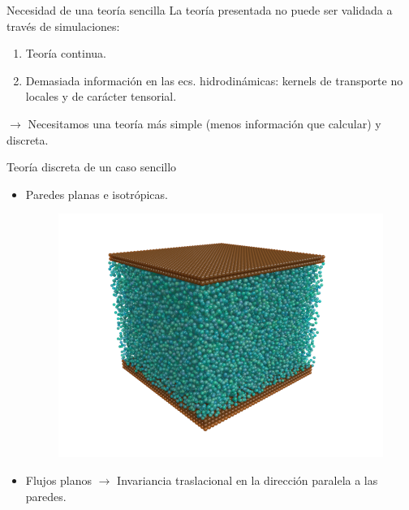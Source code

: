 \documentclass{beamer}
\begin{document}
\begin{frame}{Necesidad de una teoría sencilla}
    La teoría presentada no puede ser validada a través de simulaciones:
      \begin{enumerate}
        \item Teoría continua.
        \item Demasiada información en las ecs. hidrodinámicas: kernels de transporte no locales y de carácter tensorial. 
      \end{enumerate}
    $\rightarrow$ Necesitamos una \alert{teoría más simple} (menos información que calcular) y \alert{discreta}. 
\end{frame}


\begin{frame}{Teoría discreta de un caso sencillo}
  \begin{itemize}
    \item<1-> Paredes planas e isotrópicas. 
      \begin{figure}
        \includegraphics[width=.6\linewidth]{PRL3_gold2_wo_layers_wo_diffuse}
      \end{figure}
    \item<2-> Flujos planos $\rightarrow$ Invariancia traslacional en la dirección paralela a las paredes.
  \end{itemize}
\end{frame}
\end{document}
